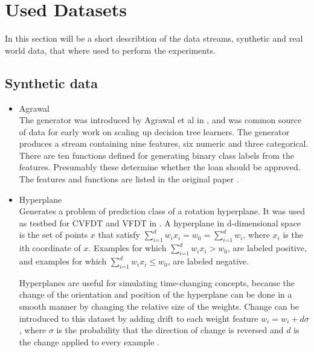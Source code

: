 \documentclass[12pt,oneside,a4paper,parskip]{scrbook}
\begin{document}
\section{Used Datasets}

In this section will be a short describtion of the data streams, synthetic and real world data, that where used to 
perform the experiments.

\subsection{Synthetic data}

\begin{itemize}
  \item Agrawal\\
        The generator was introduced by Agrawal et al in \cite{agrawal1993database}, and was common source of data for early work on scaling up 
        decision tree learners. The generator produces a stream containing nine features, six numeric and three categorical. 
        There are ten functions defined for generating binary class labels from the features. Presumably these determine 
        whether the loan should be approved. The features and functions are listed in the original paper \cite{agrawal1993database,skmultiflow}.

  \item Hyperplane\\
        Generates a problem of prediction class of a rotation hyperplane. It was used as testbed for CVFDT and VFDT in \cite{hyperplane}.
        A hyperplane in d-dimensional space is the set of points $x$ that satisfy $\sum^d_\textit{i=1} w_ix_i=w_0 = \sum^d_\textit{i=1} w_i$,
        where $x_i$ is the ith coordinate of $x$.  Examples for which $\sum^d_\textit{i=1} w_ix_i>w_0$, are 
        labeled positive, and examples for which $\sum^d_\textit{i=1}w_ix_i\leq w_0$, are labeled negative.

        Hyperplanes are useful for simulating time-changing concepts, because the change of the orientation and position
        of the hyperplane can be done in a smooth manner by changing the relative size of the weights.
        Change can be introduced to this dataset by adding drift to each weight feature $w_i=w_i + d\sigma$, where $\sigma$ is the 
        probability that the direction of change is reversed and $d$ is the change applied to every example \cite{skmultiflow}.


\end{itemize}
\end{document}
